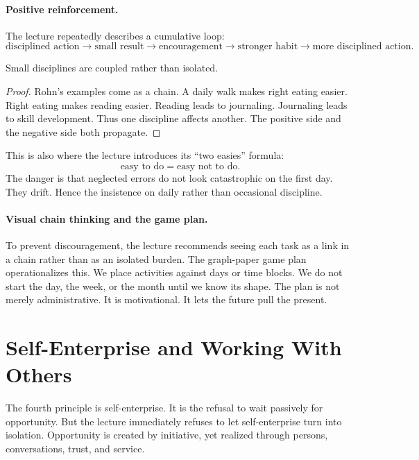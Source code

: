 \paragraph{Positive reinforcement.}
The lecture repeatedly describes a cumulative loop:
\begin{equation}
\text{disciplined action}
\longrightarrow
\text{small result}
\longrightarrow
\text{encouragement}
\longrightarrow
\text{stronger habit}
\longrightarrow
\text{more disciplined action}.
\end{equation}

\begin{proposition}
Small disciplines are coupled rather than isolated.
\end{proposition}

\begin{proof}
Rohn's examples come as a chain. A daily walk makes right eating easier. Right eating makes reading easier. Reading leads to journaling. Journaling leads to skill development. Thus one discipline affects another. The positive side and the negative side both propagate.
\end{proof}

This is also where the lecture introduces its ``two easies'' formula:
\begin{equation}
\text{easy to do} = \text{easy not to do}.
\end{equation}
The danger is that neglected errors do not look catastrophic on the first day. They drift. Hence the insistence on daily rather than occasional discipline.

\paragraph{Visual chain thinking and the game plan.}
To prevent discouragement, the lecture recommends seeing each task as a link in a chain rather than as an isolated burden. The graph-paper game plan operationalizes this. We place activities against days or time blocks. We do not start the day, the week, or the month until we know its shape. The plan is not merely administrative. It is motivational. It lets the future pull the present.

\section{Self-Enterprise and Working With Others}

The fourth principle is self-enterprise. It is the refusal to wait passively for opportunity. But the lecture immediately refuses to let self-enterprise turn into isolation. Opportunity is created by initiative, yet realized through persons, conversations, trust, and service.

